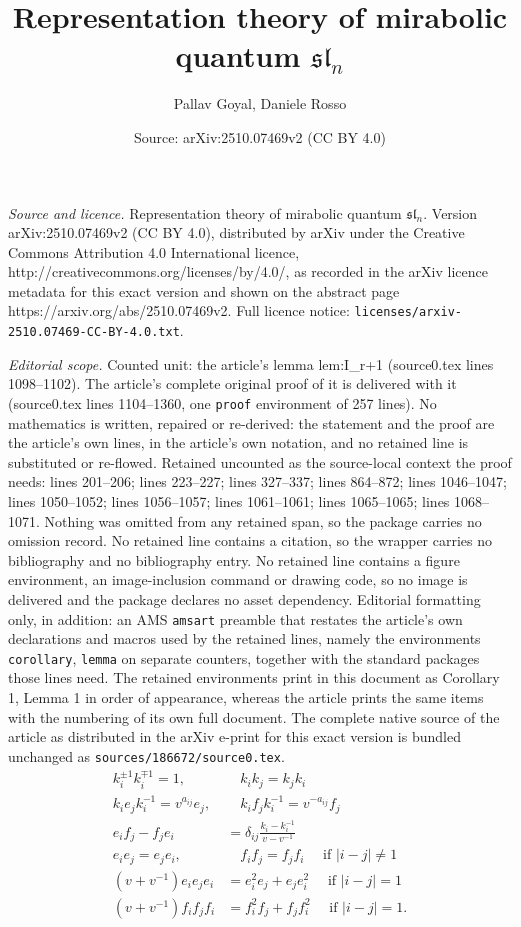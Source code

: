 \documentclass[10pt,a4paper]{amsart}
\title{Representation theory of mirabolic quantum $\mathfrak{sl}_n$}
\author{Pallav Goyal, Daniele Rosso}
\date{Source: arXiv:2510.07469v2 (CC BY 4.0)}
\begin{document}
\maketitle

\noindent\emph{Source and licence.} Representation theory of mirabolic quantum $\mathfrak{sl}_n$. Version arXiv:2510.07469v2 (CC BY 4.0), distributed by arXiv under the Creative Commons Attribution 4.0 International licence, http://creativecommons.org/licenses/by/4.0/, as recorded in the arXiv licence metadata for this exact version and shown on the abstract page https://arxiv.org/abs/2510.07469v2. Full licence notice: \texttt{licenses/arxiv-2510.07469-CC-BY-4.0.txt}.\par\smallskip

\noindent\textit{Editorial scope.} Counted unit: the article's lemma lem:I\_r+1 (source0.tex lines 1098--1102). The article's complete original proof of it is delivered with it (source0.tex lines 1104--1360, one \texttt{proof} environment of 257 lines). No mathematics is written, repaired or re-derived: the statement and the proof are the article's own lines, in the article's own notation, and no retained line is substituted or re-flowed.  Retained uncounted as the source-local context the proof needs: lines 201--206; lines 223--227; lines 327--337; lines 864--872; lines 1046--1047; lines 1050--1052; lines 1056--1057; lines 1061--1061; lines 1065--1065; lines 1068--1071.  Nothing was omitted from any retained span, so the package carries no omission record.  No retained line contains a citation, so the wrapper carries no bibliography and no bibliography entry.  No retained line contains a figure environment, an image-inclusion command or drawing code, so no image is delivered and the package declares no asset dependency.  Editorial formatting only, in addition: an AMS \texttt{amsart} preamble that restates the article's own declarations and macros used by the retained lines, namely the environments \texttt{corollary}, \texttt{lemma} on separate counters, together with the standard packages those lines need.  The retained environments print in this document as Corollary 1, Lemma 1 in order of appearance, whereas the article prints the same items with the numbering of its own full document.  The complete native source of the article as distributed in the arXiv e-print for this exact version is bundled unchanged as \texttt{sources/186672/source0.tex}.
\begin{align}\label{eq:usln.1} k_i^{\pm1}k_i^{\mp1}=1, & \quad k_ik_j=k_jk_i \\
\label{eq:usln.2} k_ie_jk_i^{-1} = v^{a_{ij}}e_j, & \quad k_if_jk_i^{-1} = v^{-a_{ij}}f_j\\
\label{eq:usln.3} e_if_j-f_je_i & =  \delta_{ij}\frac{k_i-k_i^{-1}}{v-v^{-1}}\\
\label{eq:usln.4} e_ie_j=e_je_i, & \quad f_if_j=f_jf_i \quad\text{ if }|i-j| \neq 1 \\
\label{eq:usln.5} (v+v^{-1})e_ie_je_i & =  e_i^2e_j + e_je_i^2 \quad\text{ if }|i-j| = 1\\
\label{eq:usln.6} (v+v^{-1})f_if_jf_i & =  f_i^2f_j + f_jf_i^2 \quad\text{ if }|i-j| = 1.\end{align}
\end{document}
